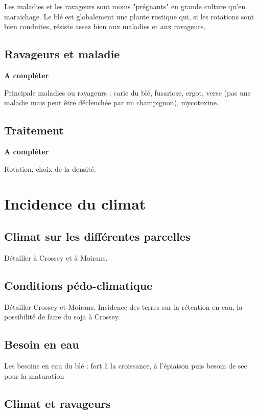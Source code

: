 \documentclass{article}
\begin{document}
Les maladies et les ravageurs sont moins "prégnants" en grande culture qu'en maraichage. Le blé est globalement une plante rustique qui, si les rotations sont bien conduites, résiste assez bien aux maladies et aux ravageurs.

\subsection{Ravageurs et maladie}

\textbf{A compléter}

Principale maladies ou ravageurs : carie du blé, fusariose, ergot, verse (pas une maladie mais peut être déclenchée par un champignon), mycotoxine.

\subsection{Traitement}

\textbf{A compléter}

Rotation, choix de la densité. 

\section{Incidence du climat}

\subsection{Climat sur les différentes parcelles}

Détailler à Crossey et à Moirans. 

\subsection{Conditions pédo-climatique}

Détailler Crossey et Moirans. Incidence des terres sur la rétention en eau, la possibilité de faire du soja à Crossey.

\subsection{Besoin en eau}

Les besoins en eau du blé : fort à la croissance, à l'épiaison puis besoin de sec pour la maturation

\subsection{Climat et ravageurs}
\end{document}
